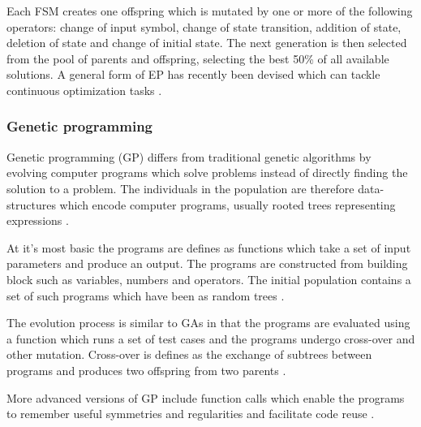 Each FSM creates one offspring which is mutated by one or more of the following operators: change of input symbol, change of state transition, addition of state, deletion of state and change of initial state. The next generation is then selected from the pool of parents and offspring, selecting the best 50\% of all available solutions. A general form of EP has recently been devised which can tackle continuous optimization tasks \cite{Michalewicz1997}.

\subsubsection{Genetic programming}

Genetic programming (GP) differs from traditional genetic algorithms by evolving computer programs which solve problems instead of directly finding the solution to a problem. The individuals in the population are therefore data-structures which encode computer programs, usually rooted trees representing expressions \cite{Michalewicz1997}.

At it's most basic the programs are defines as functions which take a set of input parameters and produce an output. The programs are constructed from building block such as variables, numbers and operators. The initial population contains a set of such programs which have been as random trees \cite{Michalewicz1997}.

The evolution process is similar to GAs in that the programs are evaluated using a function which runs a set of test cases and the programs undergo cross-over and other mutation. Cross-over is defines as the exchange of subtrees between programs and produces two offspring from two parents \cite{Michalewicz1997}.

More advanced versions of GP include function calls which enable the programs to remember useful symmetries and regularities and facilitate code reuse \cite{Michalewicz1997}.
